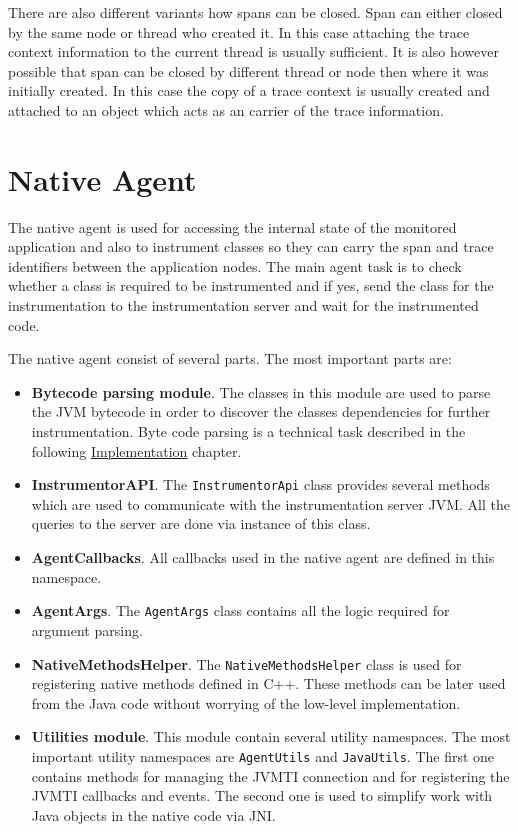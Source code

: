 There are also different variants how spans can be closed. Span can either closed by the same node or thread who created it. In this case attaching the trace context information to the current thread is usually sufficient. It is also however possible that span can be closed by different thread or node then where it was initially created. In this case the copy of a trace context is usually created and attached to an object which acts as an carrier of the trace information.
\section{Native Agent}
\label{native_agent_design}
The native agent is used for accessing the internal state of the monitored application and also to instrument classes so they can carry the span and trace identifiers between the application nodes. The main agent task is to check whether a class is required to be instrumented and if yes, send the class for the instrumentation to the instrumentation server and wait for the instrumented code.

The native agent consist of several parts. The most important parts are:
\begin{itemize}
	\item \textbf{Bytecode parsing module}. \newline The classes in this module are used to parse the JVM bytecode in order to discover the classes dependencies for further instrumentation. Byte code parsing is a technical task described in the following \hyperref[chap:implementation]{Implementation} chapter.
	\item \textbf{InstrumentorAPI}. \newline The \texttt{InstrumentorApi} class provides several methods which are used to communicate with the instrumentation server JVM. All the queries to the server are done via instance of this class.
	\item \textbf{AgentCallbacks}. \newline All callbacks used in the native agent are defined in this namespace.
	\item \textbf{AgentArgs}.  \newline The \texttt{AgentArgs} class contains all the logic required for argument parsing.
	\item \textbf{NativeMethodsHelper}. \newline The \texttt{NativeMethodsHelper} class is used for registering native methods defined in C++. These methods can be later used from the Java code without worrying of the low-level implementation.
	\item \textbf{Utilities module}. \newline This module contain several utility namespaces. The most important utility namespaces are \texttt{AgentUtils} and \texttt{JavaUtils}. The first one contains methods for managing the JVMTI connection and for registering the JVMTI callbacks and events. The second one is used to simplify work with Java objects in the native code via JNI. 
\end{itemize}

